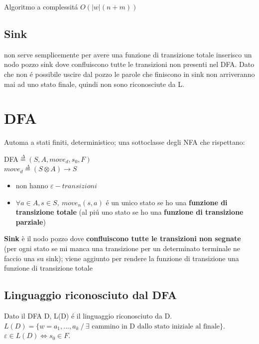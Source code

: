 Algoritmo a complessit\'a $O(|w|(n+m))$ 

\subsection{Sink}
non serve semplicemente per avere una funzione di transizione totale inserisco un nodo pozzo sink dove confluiscono
tutte le transizioni non presenti nel DFA. Dato che non \'e possibile uscire dal pozzo le parole che finiscono in sink non arriveranno 
mai ad uno stato finale, quindi non sono riconosciute da L. 

\section{DFA}
Automa a stati finiti, deterministico; una sottoclasse degli NFA che rispettano:
\begin{center}
    DFA$\overset{\Delta}{=}(S,A,move_d,s_0,F)$  \\
    $move_d \overset{\Delta}{=} (S \otimes A) \rightarrow S$\\
\end{center}
\begin{itemize}
    \item non hanno $\varepsilon-transizioni$\\
    \item $\forall a \in A, s \in S,\ move_n(s,a)$ \'e un unico stato se ho una \textbf{funzione di transizione totale} 
    (al pi\'u uno stato se ho una \textbf{funzione di transizione parziale})\\
\end{itemize}
\begin{tcolorbox}\begin{center}
    \textbf{Sink} è il nodo pozzo dove \textbf{confluiscono tutte le transizioni non segnate} 
    (per ogni stato se mi manca una transizione per un determinato terminale ne faccio una su sink);
    viene aggiunto per rendere la funzione di transizione una funzione di transizione totale
\end{center}\end{tcolorbox}

\subsection{Linguaggio riconosciuto dal DFA}
Dato il DFA D, L(D) \'e il linguaggio riconosciuto da D. \\
$L(D) = \{ w=a_1,...,a_k \ / \ \exists \text{ cammino in D dallo stato iniziale al finale}\}$.
$\varepsilon \in L(D) \iff s_0 \in F$.

